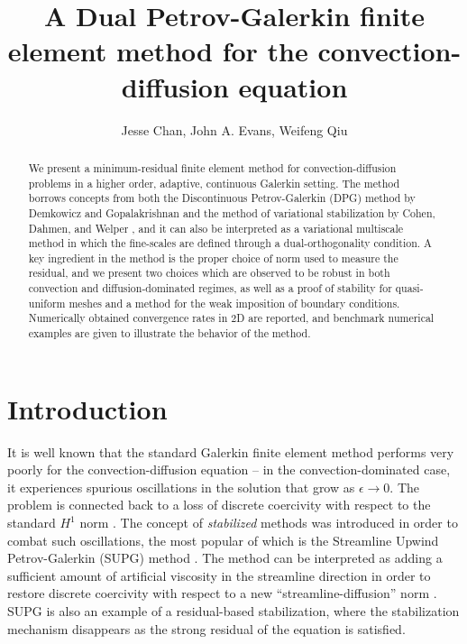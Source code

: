 \documentclass[final,leqno]{siamltex}
\title{A Dual Petrov-Galerkin finite element method for the convection-diffusion equation}
\author{Jesse Chan, John A. Evans, Weifeng Qiu}
\date{}
\begin{document}
\maketitle

\begin{abstract}
We present a minimum-residual finite element method for convection-diffusion problems in a higher order, adaptive, continuous Galerkin setting.  The method borrows concepts from both the Discontinuous Petrov-Galerkin (DPG) method by Demkowicz and Gopalakrishnan \cite{DPG2} and the method of variational stabilization by Cohen, Dahmen, and Welper \cite{DahmenVariationalStabilization}, and it can also be interpreted as a variational multiscale method in which the fine-scales are defined through a dual-orthogonality condition.  A key ingredient in the method is the proper choice of norm used to measure the residual, and we present two choices which are observed to be robust in both convection and diffusion-dominated regimes, as well as a proof of stability for quasi-uniform meshes and a method for the weak imposition of boundary conditions.  Numerically obtained convergence rates in 2D are reported, and benchmark numerical examples are given to illustrate the behavior of the method.  
\end{abstract}


\section{Introduction}

It is well known that the standard Galerkin finite element method performs very poorly for the convection-diffusion equation -- in the convection-dominated case, it experiences spurious oscillations in the solution that grow as $\epsilon \rightarrow 0$.  The problem is connected back to a loss of discrete coercivity with respect to the standard $H^1$ norm \cite{roos2008robust}.  The concept of \textit{stabilized} methods was introduced in order to combat such oscillations, the most popular of which is the Streamline Upwind Petrov-Galerkin (SUPG) method \cite{SUPG}.  The method can be interpreted as adding a sufficient amount of artificial viscosity in the streamline direction in order to restore discrete coercivity with respect to a new ``streamline-diffusion'' norm \cite{johnsonCrosswind}.  SUPG is also an example of a residual-based stabilization, where the stabilization mechanism disappears as the strong residual of the equation is satisfied.  
\end{document}
